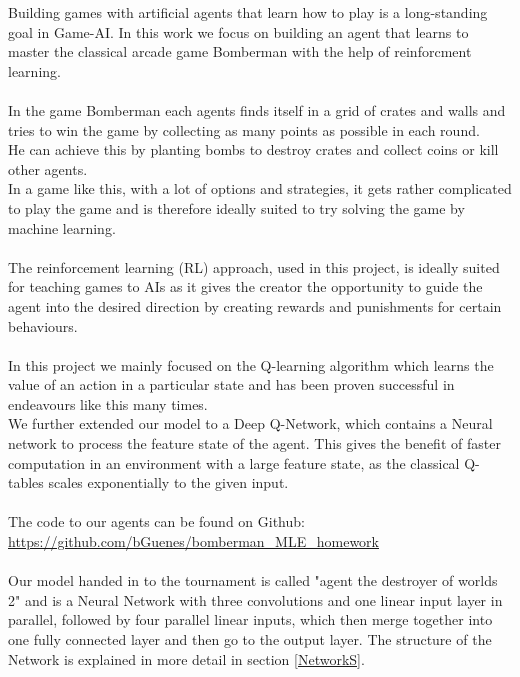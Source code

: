 

Building games with artificial agents that learn how to play is a long-standing goal in Game-AI. In this work we focus on building an agent that learns to master the classical arcade game Bomberman with the help of reinforcment learning.\\ \\
In the game Bomberman each agents finds itself in a grid of crates and walls and tries to win the game by collecting as many points as possible in each round.\\
He can achieve this by planting bombs to destroy crates and collect coins or kill other agents. \\
In a game like this, with a lot of options and strategies, it gets rather complicated to play the game and is therefore ideally suited to try solving the game by machine learning.\\ \\
The reinforcement learning (RL) approach, used in this project, is ideally suited for teaching games to AIs as it gives the creator the opportunity to guide the agent into the desired direction by creating rewards and punishments for certain behaviours.\\ \\
In this project we mainly focused on the Q-learning algorithm which learns the value of an action in a particular state and has been proven successful in endeavours like this many times. \\
We further extended our model to a Deep Q-Network, which contains a Neural network to process the feature state of the agent. This gives the benefit of faster computation in an environment with a large feature state, as the classical Q-tables scales exponentially to the given input.\\ \\
The code to our agents can be found on Github: \\
\url{https://github.com/bGuenes/bomberman_MLE_homework} \\ \\
Our model handed in to the tournament is called "agent the destroyer of worlds 2" and is a Neural Network with three convolutions and one linear input layer in parallel, followed by four parallel linear inputs, which then merge together into one fully connected layer and then go to the output layer. The structure of the Network is explained in more detail in section \ref{NetworkS}. \\
